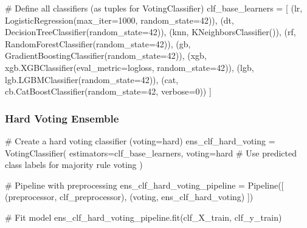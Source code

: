 \documentclass[
  letterpaper,
  DIV=11,
  numbers=noendperiod]{scrreprt}
\newenvironment{Shaded}{\begin{snugshade}}{\end{snugshade}}
\newcommand{\CommentTok}[1]{\textcolor[rgb]{0.37,0.37,0.37}{#1}}
\newcommand{\DecValTok}[1]{\textcolor[rgb]{0.68,0.00,0.00}{#1}}
\newcommand{\NormalTok}[1]{\textcolor[rgb]{0.00,0.23,0.31}{#1}}
\newcommand{\OperatorTok}[1]{\textcolor[rgb]{0.37,0.37,0.37}{#1}}
\newcommand{\StringTok}[1]{\textcolor[rgb]{0.13,0.47,0.30}{#1}}
\begin{document}
\begin{Shaded}
\begin{Highlighting}[]
\CommentTok{\# Define all classifiers (as tuples for VotingClassifier)}
\NormalTok{clf\_base\_learners }\OperatorTok{=}\NormalTok{ [}
\NormalTok{    (}\StringTok{\textquotesingle{}lr\textquotesingle{}}\NormalTok{, LogisticRegression(max\_iter}\OperatorTok{=}\DecValTok{1000}\NormalTok{, random\_state}\OperatorTok{=}\DecValTok{42}\NormalTok{)),}
\NormalTok{    (}\StringTok{\textquotesingle{}dt\textquotesingle{}}\NormalTok{, DecisionTreeClassifier(random\_state}\OperatorTok{=}\DecValTok{42}\NormalTok{)),}
\NormalTok{    (}\StringTok{\textquotesingle{}knn\textquotesingle{}}\NormalTok{, KNeighborsClassifier()),}
\NormalTok{    (}\StringTok{\textquotesingle{}rf\textquotesingle{}}\NormalTok{, RandomForestClassifier(random\_state}\OperatorTok{=}\DecValTok{42}\NormalTok{)),}
\NormalTok{    (}\StringTok{\textquotesingle{}gb\textquotesingle{}}\NormalTok{, GradientBoostingClassifier(random\_state}\OperatorTok{=}\DecValTok{42}\NormalTok{)),}
\NormalTok{    (}\StringTok{\textquotesingle{}xgb\textquotesingle{}}\NormalTok{, xgb.XGBClassifier(eval\_metric}\OperatorTok{=}\StringTok{\textquotesingle{}logloss\textquotesingle{}}\NormalTok{, random\_state}\OperatorTok{=}\DecValTok{42}\NormalTok{)),}
\NormalTok{    (}\StringTok{\textquotesingle{}lgb\textquotesingle{}}\NormalTok{, lgb.LGBMClassifier(random\_state}\OperatorTok{=}\DecValTok{42}\NormalTok{)),}
\NormalTok{    (}\StringTok{\textquotesingle{}cat\textquotesingle{}}\NormalTok{, cb.CatBoostClassifier(random\_state}\OperatorTok{=}\DecValTok{42}\NormalTok{, verbose}\OperatorTok{=}\DecValTok{0}\NormalTok{))}
\NormalTok{]}
\end{Highlighting}
\end{Shaded}

\subsubsection{Hard Voting Ensemble}\label{hard-voting-ensemble}

\begin{Shaded}
\begin{Highlighting}[]
\CommentTok{\# Create a hard voting classifier (voting=\textquotesingle{}hard\textquotesingle{})}
\NormalTok{ens\_clf\_hard\_voting }\OperatorTok{=}\NormalTok{ VotingClassifier(}
\NormalTok{    estimators}\OperatorTok{=}\NormalTok{clf\_base\_learners,}
\NormalTok{    voting}\OperatorTok{=}\StringTok{\textquotesingle{}hard\textquotesingle{}}  \CommentTok{\# Use predicted class labels for majority rule voting}
\NormalTok{)}

\CommentTok{\# Pipeline with preprocessing}
\NormalTok{ens\_clf\_hard\_voting\_pipeline }\OperatorTok{=}\NormalTok{ Pipeline([}
\NormalTok{    (}\StringTok{\textquotesingle{}preprocessor\textquotesingle{}}\NormalTok{, clf\_preprocessor),}
\NormalTok{    (}\StringTok{\textquotesingle{}voting\textquotesingle{}}\NormalTok{, ens\_clf\_hard\_voting)}
\NormalTok{])}

\CommentTok{\# Fit model}
\NormalTok{ens\_clf\_hard\_voting\_pipeline.fit(clf\_X\_train, clf\_y\_train)}
\end{Highlighting}
\end{Shaded}
\end{document}
